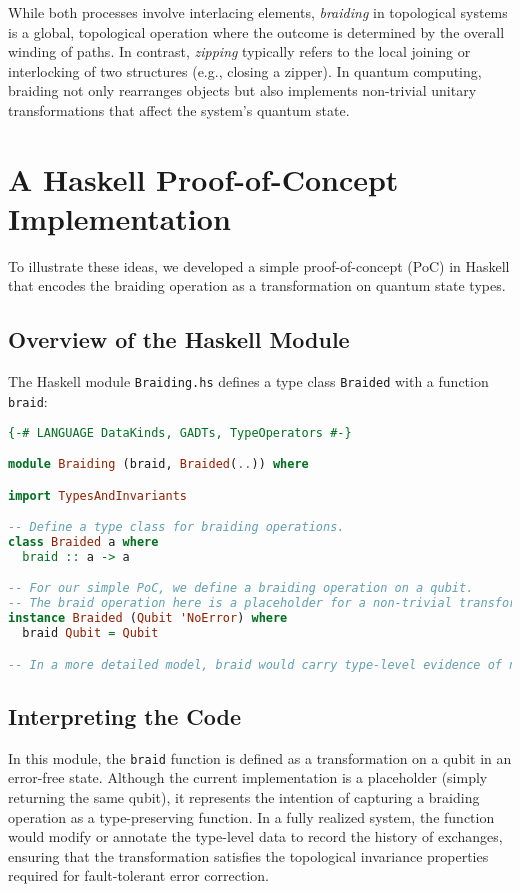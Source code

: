 \documentclass[12pt]{article}
\begin{document}
While both processes involve interlacing elements, \emph{braiding} in topological systems is a global, topological operation where the outcome is determined by the overall winding of paths. In contrast, \emph{zipping} typically refers to the local joining or interlocking of two structures (e.g., closing a zipper). In quantum computing, braiding not only rearranges objects but also implements non-trivial unitary transformations that affect the system's quantum state.

\section{A Haskell Proof-of-Concept Implementation}

To illustrate these ideas, we developed a simple proof-of-concept (PoC) in Haskell that encodes the braiding operation as a transformation on quantum state types.

\subsection{Overview of the Haskell Module}

The Haskell module \texttt{Braiding.hs} defines a type class \texttt{Braided} with a function \texttt{braid}:
\begin{lstlisting}[language=Haskell, caption={Braiding.hs}]
{-# LANGUAGE DataKinds, GADTs, TypeOperators #-}

module Braiding (braid, Braided(..)) where

import TypesAndInvariants

-- Define a type class for braiding operations.
class Braided a where
  braid :: a -> a

-- For our simple PoC, we define a braiding operation on a qubit.
-- The braid operation here is a placeholder for a non-trivial transformation.
instance Braided (Qubit 'NoError) where
  braid Qubit = Qubit

-- In a more detailed model, braid would carry type-level evidence of non-trivial braiding.
\end{lstlisting}

\subsection{Interpreting the Code}

In this module, the \texttt{braid} function is defined as a transformation on a qubit in an error-free state. Although the current implementation is a placeholder (simply returning the same qubit), it represents the intention of capturing a braiding operation as a type-preserving function. In a fully realized system, the function would modify or annotate the type-level data to record the history of exchanges, ensuring that the transformation satisfies the topological invariance properties required for fault-tolerant error correction.
\end{document}
